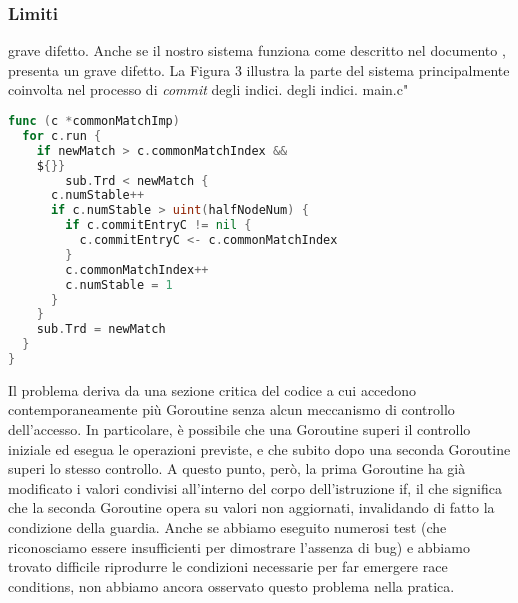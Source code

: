 \subsubsection{Limiti}
grave difetto. 
Anche se il nostro sistema funziona come descritto nel documento \cite{1}, presenta un 
grave difetto. 
La Figura 3 illustra la parte del sistema principalmente coinvolta nel processo di \textit{commit} 
degli indici.
degli indici.
main.c"
\begin{lstlisting}[language=Go]
func (c *commonMatchImp) 
  for c.run { 
    if newMatch > c.commonMatchIndex && 
    ${}}
        sub.Trd < newMatch { 
      c.numStable++ 
      if c.numStable > uint(halfNodeNum) {
        if c.commitEntryC != nil {
          c.commitEntryC <- c.commonMatchIndex
        } 
        c.commonMatchIndex++
        c.numStable = 1
      } 
    } 
    sub.Trd = newMatch
  } 
}
\end{lstlisting}
Il problema deriva da una sezione critica del codice a cui accedono contemporaneamente più 
Goroutine senza alcun meccanismo di controllo dell'accesso. In particolare, è possibile che una Goroutine 
superi il controllo iniziale ed esegua le operazioni previste, e che subito dopo una seconda 
Goroutine superi lo stesso controllo. A questo punto, però, la prima Goroutine ha già modificato i 
valori condivisi all'interno del corpo dell'istruzione if, il che significa che la seconda Goroutine 
opera su valori non aggiornati, invalidando di fatto la condizione della guardia. Anche se abbiamo 
eseguito numerosi test (che riconosciamo essere insufficienti per dimostrare l'assenza di bug) e 
abbiamo trovato difficile riprodurre le condizioni necessarie per far emergere race conditions,
non abbiamo ancora osservato questo problema nella pratica.
